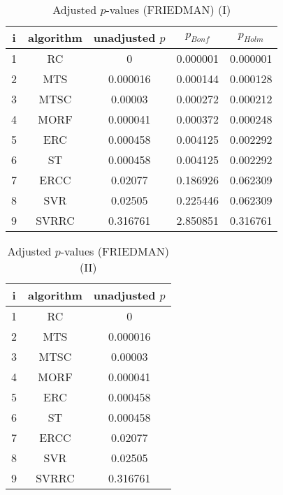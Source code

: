 \documentclass[a4paper,10pt]{article}
\begin{document}
\begin{landscape}
\begin{table}[!htp]
\centering\small
\begin{tabular}{ccccc}
i&algorithm&unadjusted $p$&$p_{Bonf}$&$p_{Holm}$\\
\hline1&RC&0&0.000001&0.000001\\2&MTS&0.000016&0.000144&0.000128\\3&MTSC&0.00003&0.000272&0.000212\\4&MORF&0.000041&0.000372&0.000248\\5&ERC&0.000458&0.004125&0.002292\\6&ST&0.000458&0.004125&0.002292\\7&ERCC&0.02077&0.186926&0.062309\\8&SVR&0.02505&0.225446&0.062309\\9&SVRRC&0.316761&2.850851&0.316761\\\hline
\end{tabular}
\caption{Adjusted $p$-values (FRIEDMAN) (I)}
\end{table}
\begin{table}[!htp]
\centering\small
\begin{tabular}{ccc}
i&algorithm&unadjusted $p$\\
\hline1&RC&0\\2&MTS&0.000016\\3&MTSC&0.00003\\4&MORF&0.000041\\5&ERC&0.000458\\6&ST&0.000458\\7&ERCC&0.02077\\8&SVR&0.02505\\9&SVRRC&0.316761\\\hline
\end{tabular}
\caption{Adjusted $p$-values (FRIEDMAN) (II)}
\end{table}

\newpage
\end{landscape}
\end{document}
